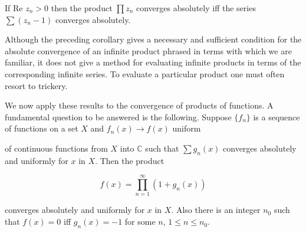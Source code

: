 If $\text{Re } z_n > 0$ then the product $\prod z_n$ converges absolutely iff the series $\sum (z_n - 1)$ converges absolutely.

Although the preceding corollary gives a necessary and sufficient condition for the absolute convergence of an infinite product phrased in terms with which we are familiar, it does not give a method for evaluating infinite products in terms of the corresponding infinite series. To evaluate a particular product one must often resort to trickery.

We now apply these results to the convergence of products of functions. A fundamental question to be answered is the following. Suppose $\{f_n\}$ is a sequence of functions on a set $X$ and $f_n(x) \rightarrow f(x)$ uniform

of continuous functions from $X$ into $\mathbb{C}$ such that $\sum g_n(x)$ converges absolutely and uniformly for $x$ in $X$. Then the product

$$f(x) = \prod_{n=1}^{\infty} (1 + g_n(x))$$

converges absolutely and uniformly for $x$ in $X$. Also there is an integer $n_0$ such that $f(x) = 0$ iff $g_n(x) = -1$ for some $n$, $1 \leq n \leq n_0$.